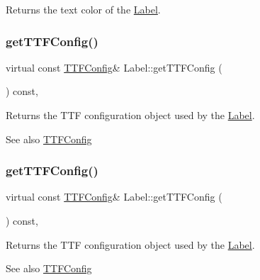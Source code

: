 Returns the text color of the \hyperlink{classLabel}{Label}. \mbox{\label{classLabel_a94ccd8344df3bf3b840f6a71f7a16d23}} 
\subsubsection{\texorpdfstring{get\+T\+T\+F\+Config()}{getTTFConfig()}\hspace{0.1cm}{\footnotesize\ttfamily [1/2]}}
{\footnotesize\ttfamily virtual const \hyperlink{structTTFConfig}{T\+T\+F\+Config}\& Label\+::get\+T\+T\+F\+Config (\begin{DoxyParamCaption}{ }\end{DoxyParamCaption}) const\hspace{0.3cm}{\ttfamily [inline]}, {\ttfamily [virtual]}}

Returns the T\+TF configuration object used by the \hyperlink{classLabel}{Label}. \begin{DoxySeeAlso}{See also}
{\ttfamily \hyperlink{structTTFConfig}{T\+T\+F\+Config}} 
\end{DoxySeeAlso}
\mbox{\label{classLabel_a94ccd8344df3bf3b840f6a71f7a16d23}} 
\subsubsection{\texorpdfstring{get\+T\+T\+F\+Config()}{getTTFConfig()}\hspace{0.1cm}{\footnotesize\ttfamily [2/2]}}
{\footnotesize\ttfamily virtual const \hyperlink{structTTFConfig}{T\+T\+F\+Config}\& Label\+::get\+T\+T\+F\+Config (\begin{DoxyParamCaption}{ }\end{DoxyParamCaption}) const\hspace{0.3cm}{\ttfamily [inline]}, {\ttfamily [virtual]}}

Returns the T\+TF configuration object used by the \hyperlink{classLabel}{Label}. \begin{DoxySeeAlso}{See also}
{\ttfamily \hyperlink{structTTFConfig}{T\+T\+F\+Config}} 
\end{DoxySeeAlso}
\mbox{\label{classLabel_ab3981bcbc2730ddda1cbb68a0faf20ac}} 
